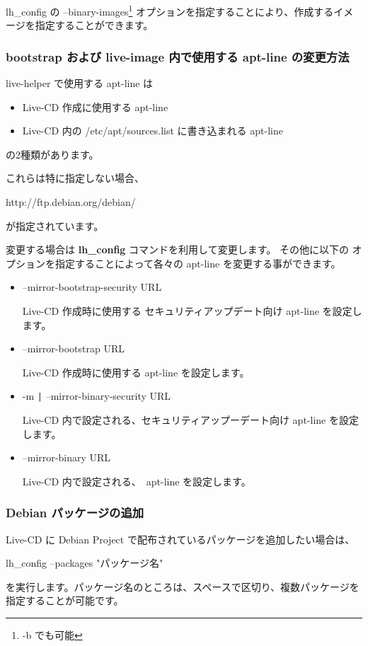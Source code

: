 \documentclass[mingoth,a4paper]{jsarticle}
\begin{document}
lh\_config の --binary-images\footnote{-b でも可能} 
オプションを指定することにより、作成するイメージを指定することができます。

\begin{commandline}
\end{commandline}

\subsubsection{bootstrap および live-image 内で使用する apt-line の変更方法}
live-helper で使用する apt-line は
\begin{itemize}
\item Live-CD 作成に使用する apt-line
\item Live-CD 内の /etc/apt/sources.list に書き込まれる apt-line
\end{itemize}
の2種類があります。

これらは特に指定しない場合、
\begin{commandline}
http://ftp.debian.org/debian/
\end{commandline}
が指定されています。

変更する場合は {\bf lh\_config} コマンドを利用して変更します。
その他に以下の オプションを指定することによって各々の apt-line を変更する事ができます。

\begin{itemize}
\item --mirror-bootstrap-security URL

Live-CD 作成時に使用する セキュリティアップデート向け apt-line を設定します。 
\item --mirror-bootstrap URL

Live-CD 作成時に使用する apt-line を設定します。
\item -m \verb+|+ --mirror-binary-security URL

Live-CD 内で設定される、セキュリティアップーデート向け apt-line を設定します。
\item --mirror-binary URL

Live-CD 内で設定される、　apt-line を設定します。
\end{itemize}


\subsubsection{Debian パッケージの追加}
Live-CD に Debian Project で配布されているパッケージを追加したい場合は、
\begin{commandline}
lh_config --packages "パッケージ名"
\end{commandline}
を実行します。パッケージ名のところは、スペースで区切り、複数パッケージを指定することが可能です。
\end{document}
